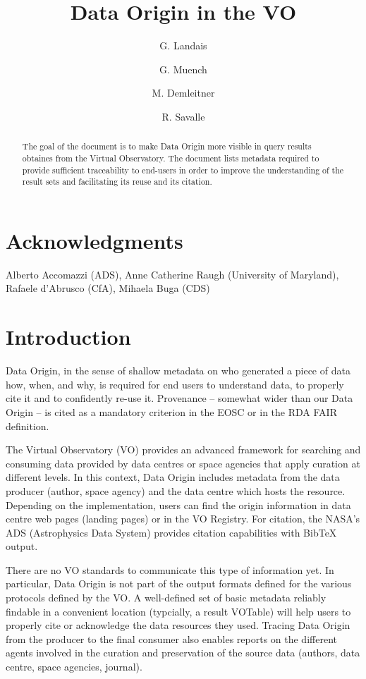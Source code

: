 \documentclass[11pt,a4paper]{ivoa}
\title{Data Origin in the VO}
\author{G. Landais}
\author{G. Muench}
\author{M. Demleitner}
\author{R. Savalle}
\begin{document}
\begin{abstract}
The goal of the document is to make Data Origin more visible in query results obtaines from the Virtual Observatory.
The document lists metadata required to provide sufficient traceability to end-users in order to improve the understanding
of the result sets and facilitating its reuse and its citation.
\end{abstract}


\section*{Acknowledgments}
Alberto Accomazzi (ADS), Anne Catherine Raugh (University of Maryland), Rafaele d'Abrusco (CfA), Mihaela Buga (CDS)


\section{Introduction}

Data Origin, in the sense of shallow metadata on who generated a piece of data how, when, and why, is required for end users to understand data, to properly cite it and to confidently re-use it.  Provenance -- somewhat wider than our Data Origin -- is cited as a mandatory criterion in the EOSC or in the RDA FAIR definition.

The Virtual Observatory (VO) provides an advanced framework for searching and consuming data provided by data centres or space agencies that apply curation at different levels.  In this context, Data Origin includes metadata from the data producer (author, space agency) and the data centre which hosts the resource.
Depending on the implementation, users can find the origin information in data centre web pages (landing pages) or in the VO Registry. For citation, the NASA's ADS (Astrophysics Data System) provides citation capabilities with BibTeX output.

 There are no VO standards to communicate this type of information yet. In particular, Data Origin is not part of the output formats defined for the various protocols defined by the VO.
A well-defined set of basic metadata reliably findable in a convenient location (typcially, a result VOTable) will help users to properly cite or
acknowledge the data resources they used.
Tracing Data Origin from the producer to the final consumer also enables reports on the different agents involved in the curation and preservation of the source data (authors, data centre, space agencies, journal).
\end{document}
